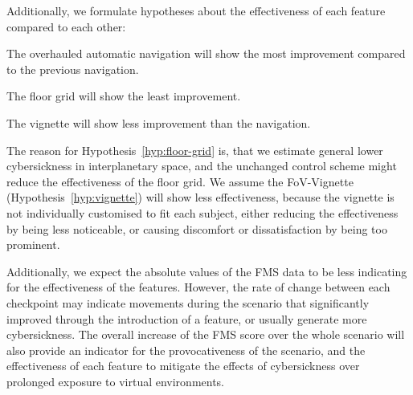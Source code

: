 Additionally, we formulate hypotheses about the effectiveness of each feature compared to each other:
\begin{hypothesis}
    \label{hyp:navigation}
    The overhauled automatic navigation will show the most improvement compared to the previous navigation.
\end{hypothesis}
\begin{hypothesis}
    \label{hyp:floor-grid}
    The floor grid will show the least improvement.
\end{hypothesis}
\begin{hypothesis}
    \label{hyp:vignette}
    The vignette will show less improvement than the navigation.
\end{hypothesis}
The reason for Hypothesis~\ref{hyp:floor-grid} is, that we estimate general lower cybersickness in interplanetary
space, and the unchanged control scheme might reduce the effectiveness of the floor grid.
We assume the FoV-Vignette (Hypothesis~\ref{hyp:vignette}) will show less effectiveness, because the vignette is not
individually customised to fit each subject, either reducing the effectiveness by being less noticeable, or causing
discomfort or dissatisfaction by being too prominent.

Additionally, we expect the absolute values of the FMS data to be less indicating for the effectiveness of the
features.
However, the rate of change between each checkpoint may indicate movements during the scenario that significantly
improved through the introduction of a feature, or usually generate more cybersickness.
The overall increase of the FMS score over the whole scenario will also provide an indicator for the provocativeness
of the scenario, and the effectiveness of each feature to mitigate the effects of cybersickness over prolonged exposure
to virtual environments.
